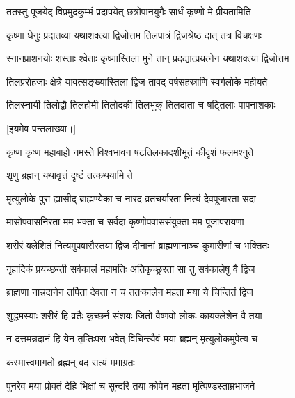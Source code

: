 \twolineshloka
{ततस्तु पूजयेद् विप्रमुदकुम्भं प्रदापयेत्}
{छत्रोपानयुगैः सार्धं कृष्णो मे प्रीयतामिति} %

\twolineshloka
{कृष्णा धेनुः प्रदातव्या यथाशक्त्या द्विजोत्तम}
{तिलपात्रं द्विजश्रेष्ठ दात् तत्र विचक्षणः} %

\twolineshloka
{स्नानप्राशनयोः शस्ताः श्वेताः कृष्णास्तिला मुने}
{तान् प्रदद्यात्प्रयत्नेन यथाशक्त्या द्विजोत्तम} %

\twolineshloka
{तिलप्ररोहजाः क्षेत्रे यावत्सङ्ख्यास्तिला द्विज}
{तावद् वर्षसहस्राणि स्वर्गलोके महीयते} %

\twolineshloka
{तिलस्नायी तिलोद्वौ तिलहोमी तिलोदकी}
{तिलभुक् तिलदाता च षट्तिलाः पापनाशकाः} %

[इयमेव पन्तलाख्या।]


\twolineshloka
{कृष्ण कृष्ण महाबाहो नमस्ते विश्वभावन}
{षटतिलकादशीभूतं कीदृशं फलमश्नुते} %



\onelineshloka
{शृणु ब्रह्मन् यथावृत्तं दृष्टं तत्कथयामि ते} %

\twolineshloka
{मृत्युलोके पुरा ह्यासीद् ब्राह्मण्येका च नारद}
{व्रतचर्यारता नित्यं देवपूजारता सदा} %

\twolineshloka
{मासोपवासनिरता मम भक्ता च सर्वदा}
{कृष्णोपवाससंयुक्ता मम पूजापरायणा} %

\twolineshloka
{शरीरं क्लेशितं नित्यमुपवासैस्तया द्विज}
{दीनानां ब्राह्मणानाञ्च कुमारीणां च भक्तितः} %

\twolineshloka
{गृहादिकं प्रयच्छन्ती सर्वकालं महामतिः}
{अतिकृच्छ्ररता सा तु सर्वकालेषु वै द्विज} %

\twolineshloka
{ब्राह्मणा नान्नदानेन तर्पिता देवता न च}
{ततःकालेन महता मया ये चिन्तितं द्विज} %

\twolineshloka
{शुद्धमस्याः शरीरं हि व्रतैः कृच्छर्न संशयः}
{जितो वैष्णवो लोकः कायक्लेशेन वै तया} %

\twolineshloka
{न दत्तमन्नदानं हि येन तृप्तिःपरा भवेत्}
{विचिन्त्यैवं मया ब्रह्मन् मृत्युलोकमुपेत्य च} %



\onelineshloka
{कस्मात्त्वमागतो ब्रह्मन् वद सत्यं ममाग्रतः} %

\twolineshloka
{पुनरेव मया प्रोक्तं देहि भिक्षां च सुन्दरि}
{तया कोपेन महता मृत्पिण्डस्ताम्रभाजने} %

